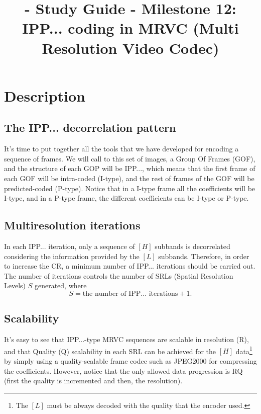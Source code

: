 
\title{\SM{} - Study Guide - Milestone 12: IPP... coding in MRVC (Multi Resolution Video Codec)}

\maketitle

\section{Description}

\subsection{The IPP... decorrelation pattern}
It's time to put together all the tools that we have developed for
encoding a sequence of frames. We will call to this set of images, a
Group Of Frames (GOF), and the structure of each GOP will be IPP...,
which means that the first frame of each GOF will be intra-coded
(I-type), and the rest of frames of the GOF will be predicted-coded
(P-type). Notice that in a I-type frame all the coefficients will be
I-type, and in a P-type frame, the different coefficients can be
I-type or P-type.

\subsection{Multiresolution iterations}
In each IPP... iteration, only a sequence of $[H]$ subbands is
decorrelated considering the information provided by the $[L]$
subbands. Therefore, in order to increase the CR, a minimum number of
IPP... iterations should be carried out. The number of iterations
controls the number of SRLs (Spatial Resolution Levels) $S$ generated,
where
\begin{equation}
  S = \text{the number of IPP... iterations} + 1.
\end{equation}

\subsection{Scalability}
It's easy to see that IPP...-type MRVC sequences are scalable in
resolution (R), and that Quality (Q) scalability in each SRL can be
achieved for the $[H]$ data\footnote{The $[L]$ must be always decoded
with the quality that the encoder used.} by simply using a
quality-scalable frame codec such as JPEG2000 for compressing the
coefficients. However, notice that the only allowed data progression
is RQ (first the quality is incremented and then, the resolution).

